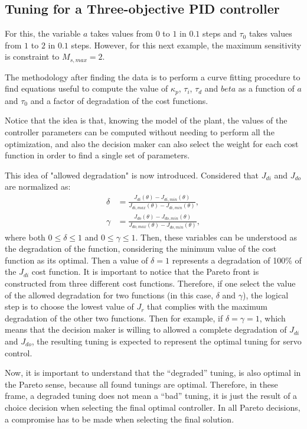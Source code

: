 \subsection{Tuning for a Three-objective PID controller}
\label{sec:Tuning3PID}
For this, the variable $a$ takes values from $0$ to $1$ in $0.1$ steps and $\tau_0$ takes values from $1$ to $2$ in $0.1$ steps. However, for this next example, the maximum sensitivity is constraint to $M_{s,max}=2$.

The methodology after finding the data is to perform a curve fitting procedure to find equations useful to compute the value of $\kappa_p$, $\tau_i$, $\tau_d$ and $beta$ as a function of $a$ and $\tau_0$ and a factor of degradation of the cost functions.

Notice that the idea is that, knowing the model of the plant, the values of the controller parameters can be computed without needing to perform all the optimization, and also the decision maker can also select the weight for each cost function in order to find a single set of parameters.

This idea of "allowed degradation" is now introduced. Considered that $J_{di}$ and $J_{do}$ are normalized as:
%
\begin{align}
\delta &= \frac{J_{di}(\theta)-J_{di, min}(\theta)}{J_{di,max}(\theta)-J_{di,min}(\theta)},\label{eq:delta}\\
\gamma &= \frac{J_{do}(\theta)-J_{do, min}(\theta)}{J_{do,max}(\theta)-J_{do,min}(\theta)},\label{eq:gamma}
\end{align}
%
where both $0 \le \delta \le 1$ and $0 \le \gamma \le 1$. Then, these variables can be understood as the degradation of the function, considering the minimum value of the cost function as its optimal. Then a value of $\delta=1$ represents a degradation of 100\% of the $J_{di}$ cost function. It is important to notice that the Pareto front is constructed from three different cost functions. Therefore, if one select the value of the allowed degradation for two functions (in this case, $\delta$ and $\gamma$), the logical step is to choose the lowest value of $J_r$ that complies with the maximum degradation of the other two functions. Then for example,  if $\delta=\gamma=1$, which means that the decision maker is willing to allowed a complete degradation of $J_{di}$ and $J_{do}$, the resulting tuning is expected to represent the optimal tuning for servo control.

Now, it is important to understand that the ``degraded'' tuning, is also optimal in the Pareto sense, because all found tunings are optimal. Therefore, in these frame, a degraded tuning does not mean a ``bad'' tuning, it is just the result of a choice decision when selecting the final optimal controller. In all Pareto decisions, a compromise has to be made when selecting the final solution.

